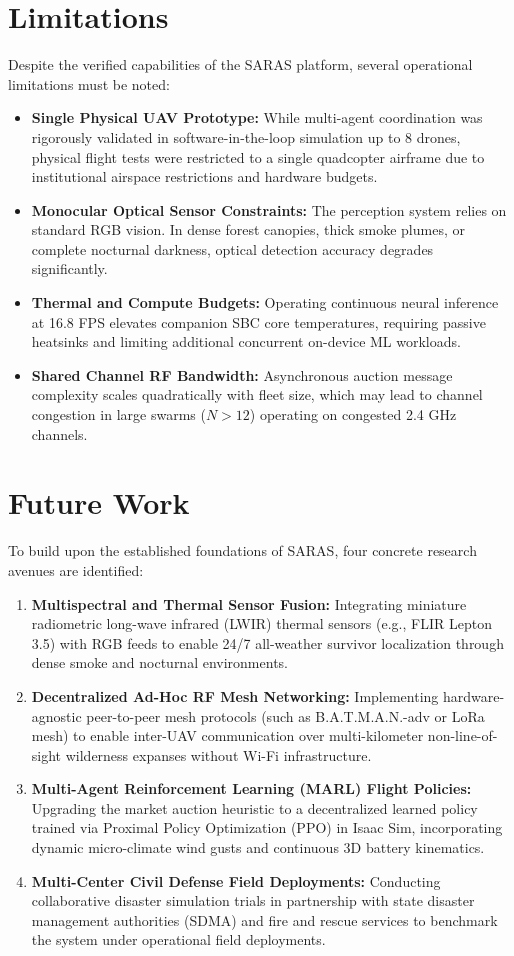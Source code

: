 \section{Limitations}

Despite the verified capabilities of the SARAS platform, several operational limitations must be noted:
\begin{itemize}
    \item \textbf{Single Physical UAV Prototype:} While multi-agent coordination was rigorously validated in software-in-the-loop simulation up to 8 drones, physical flight tests were restricted to a single quadcopter airframe due to institutional airspace restrictions and hardware budgets.
    \item \textbf{Monocular Optical Sensor Constraints:} The perception system relies on standard RGB vision. In dense forest canopies, thick smoke plumes, or complete nocturnal darkness, optical detection accuracy degrades significantly.
    \item \textbf{Thermal and Compute Budgets:} Operating continuous neural inference at 16.8 FPS elevates companion SBC core temperatures, requiring passive heatsinks and limiting additional concurrent on-device ML workloads.
    \item \textbf{Shared Channel RF Bandwidth:} Asynchronous auction message complexity scales quadratically with fleet size, which may lead to channel congestion in large swarms ($N > 12$) operating on congested 2.4 GHz channels.
\end{itemize}

\section{Future Work}

To build upon the established foundations of SARAS, four concrete research avenues are identified:
\begin{enumerate}
    \item \textbf{Multispectral and Thermal Sensor Fusion:} Integrating miniature radiometric long-wave infrared (LWIR) thermal sensors (e.g., FLIR Lepton 3.5) with RGB feeds to enable 24/7 all-weather survivor localization through dense smoke and nocturnal environments.
    \item \textbf{Decentralized Ad-Hoc RF Mesh Networking:} Implementing hardware-agnostic peer-to-peer mesh protocols (such as B.A.T.M.A.N.-adv or LoRa mesh) to enable inter-UAV communication over multi-kilometer non-line-of-sight wilderness expanses without Wi-Fi infrastructure.
    \item \textbf{Multi-Agent Reinforcement Learning (MARL) Flight Policies:} Upgrading the market auction heuristic to a decentralized learned policy trained via Proximal Policy Optimization (PPO) in Isaac Sim, incorporating dynamic micro-climate wind gusts and continuous 3D battery kinematics.
    \item \textbf{Multi-Center Civil Defense Field Deployments:} Conducting collaborative disaster simulation trials in partnership with state disaster management authorities (SDMA) and fire and rescue services to benchmark the system under operational field deployments.
\end{enumerate}
